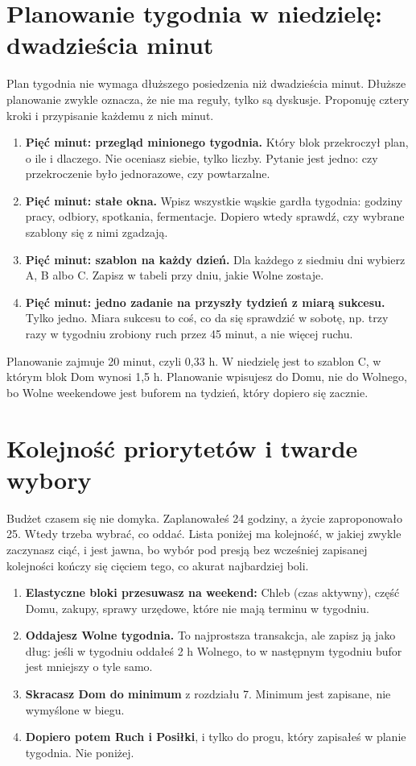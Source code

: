 \section{Planowanie tygodnia w niedzielę: dwadzieścia minut}

Plan tygodnia nie wymaga dłuższego posiedzenia niż dwadzieścia minut. Dłuższe planowanie zwykle oznacza, że nie ma reguły, tylko są dyskusje. Proponuję cztery kroki i przypisanie każdemu z nich minut.

\begin{enumerate}
\item \textbf{Pięć minut: przegląd minionego tygodnia.} Który blok przekroczył plan, o ile i dlaczego. Nie oceniasz siebie, tylko liczby. Pytanie jest jedno: czy przekroczenie było jednorazowe, czy powtarzalne.
\item \textbf{Pięć minut: stałe okna.} Wpisz wszystkie wąskie gardła tygodnia: godziny pracy, odbiory, spotkania, fermentacje. Dopiero wtedy sprawdź, czy wybrane szablony się z nimi zgadzają.
\item \textbf{Pięć minut: szablon na każdy dzień.} Dla każdego z siedmiu dni wybierz A, B albo C. Zapisz w tabeli przy dniu, jakie Wolne zostaje.
\item \textbf{Pięć minut: jedno zadanie na przyszły tydzień z miarą sukcesu.} Tylko jedno. Miara sukcesu to coś, co da się sprawdzić w sobotę, np. \glqq trzy razy w tygodniu zrobiony ruch przez 45 minut\grqq{}, a nie \glqq więcej ruchu\grqq{}.
\end{enumerate}

Planowanie zajmuje 20 minut, czyli 0,33 h. W niedzielę jest to szablon C, w którym blok Dom wynosi 1,5 h. Planowanie wpisujesz do Domu, nie do Wolnego, bo Wolne weekendowe jest buforem na tydzień, który dopiero się zacznie.

\section{Kolejność priorytetów i twarde wybory}

Budżet czasem się nie domyka. Zaplanowałeś 24 godziny, a życie zaproponowało 25. Wtedy trzeba wybrać, co oddać. Lista poniżej ma kolejność, w jakiej zwykle zaczynasz ciąć, i jest jawna, bo wybór pod presją bez wcześniej zapisanej kolejności kończy się cięciem tego, co akurat najbardziej boli.

\begin{enumerate}
\item \textbf{Elastyczne bloki przesuwasz na weekend:} Chleb (czas aktywny), część Domu, zakupy, sprawy urzędowe, które nie mają terminu w tygodniu.
\item \textbf{Oddajesz Wolne tygodnia.} To najprostsza transakcja, ale zapisz ją jako dług: jeśli w tygodniu oddałeś 2 h Wolnego, to w następnym tygodniu bufor jest mniejszy o tyle samo.
\item \textbf{Skracasz Dom do minimum} z rozdziału 7. Minimum jest zapisane, nie wymyślone w biegu.
\item \textbf{Dopiero potem Ruch i Posiłki}, i tylko do progu, który zapisałeś w planie tygodnia. Nie poniżej.
\end{enumerate}

